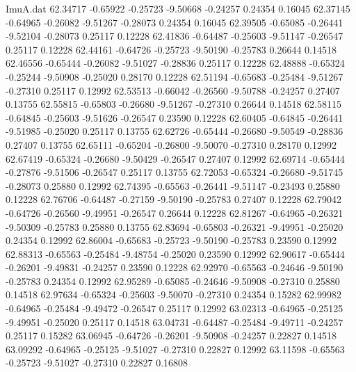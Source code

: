 \begin{filecontents}{ImuA.dat}
  62.34717   -0.65922   -0.25723   -9.50668   -0.24257    0.24354    0.16045
  62.37145   -0.64965   -0.26082   -9.51267   -0.28073    0.24354    0.16045
  62.39505   -0.65085   -0.26441   -9.52104   -0.28073    0.25117    0.12228
  62.41836   -0.64487   -0.25603   -9.51147   -0.26547    0.25117    0.12228
  62.44161   -0.64726   -0.25723   -9.50190   -0.25783    0.26644    0.14518
  62.46556   -0.65444   -0.26082   -9.51027   -0.28836    0.25117    0.12228
  62.48888   -0.65324   -0.25244   -9.50908   -0.25020    0.28170    0.12228
  62.51194   -0.65683   -0.25484   -9.51267   -0.27310    0.25117    0.12992
  62.53513   -0.66042   -0.26560   -9.50788   -0.24257    0.27407    0.13755
  62.55815   -0.65803   -0.26680   -9.51267   -0.27310    0.26644    0.14518
  62.58115   -0.64845   -0.25603   -9.51626   -0.26547    0.23590    0.12228
  62.60405   -0.64845   -0.26441   -9.51985   -0.25020    0.25117    0.13755
  62.62726   -0.65444   -0.26680   -9.50549   -0.28836    0.27407    0.13755
  62.65111   -0.65204   -0.26800   -9.50070   -0.27310    0.28170    0.12992
  62.67419   -0.65324   -0.26680   -9.50429   -0.26547    0.27407    0.12992
  62.69714   -0.65444   -0.27876   -9.51506   -0.26547    0.25117    0.13755
  62.72053   -0.65324   -0.26680   -9.51745   -0.28073    0.25880    0.12992
  62.74395   -0.65563   -0.26441   -9.51147   -0.23493    0.25880    0.12228
  62.76706   -0.64487   -0.27159   -9.50190   -0.25783    0.27407    0.12228
  62.79042   -0.64726   -0.26560   -9.49951   -0.26547    0.26644    0.12228
  62.81267   -0.64965   -0.26321   -9.50309   -0.25783    0.25880    0.13755
  62.83694   -0.65803   -0.26321   -9.49951   -0.25020    0.24354    0.12992
  62.86004   -0.65683   -0.25723   -9.50190   -0.25783    0.23590    0.12992
  62.88313   -0.65563   -0.25484   -9.48754   -0.25020    0.23590    0.12992
  62.90617   -0.65444   -0.26201   -9.49831   -0.24257    0.23590    0.12228
  62.92970   -0.65563   -0.24646   -9.50190   -0.25783    0.24354    0.12992
  62.95289   -0.65085   -0.24646   -9.50908   -0.27310    0.25880    0.14518
  62.97634   -0.65324   -0.25603   -9.50070   -0.27310    0.24354    0.15282
  62.99982   -0.64965   -0.25484   -9.49472   -0.26547    0.25117    0.12992
  63.02313   -0.64965   -0.25125   -9.49951   -0.25020    0.25117    0.14518
  63.04731   -0.64487   -0.25484   -9.49711   -0.24257    0.25117    0.15282
  63.06945   -0.64726   -0.26201   -9.50908   -0.24257    0.22827    0.14518
  63.09292   -0.64965   -0.25125   -9.51027   -0.27310    0.22827    0.12992
  63.11598   -0.65563   -0.25723   -9.51027   -0.27310    0.22827    0.16808

\end{filecontents}
